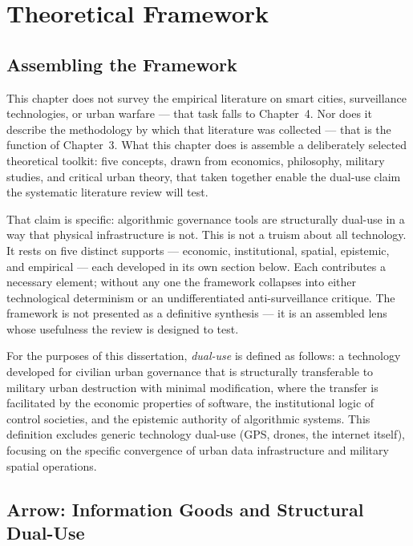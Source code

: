 \documentclass[12pt,a4paper,twoside]{report}
\begin{document}
\chapter{Theoretical Framework}
\label{ch:framework}

\section{Assembling the Framework}
\label{sec:assembling}

This chapter does not survey the empirical literature on smart cities, surveillance technologies, or urban warfare — that task falls to Chapter~4. Nor does it describe the methodology by which that literature was collected — that is the function of Chapter~3. What this chapter does is assemble a deliberately selected theoretical toolkit: five concepts, drawn from economics, philosophy, military studies, and critical urban theory, that taken together enable the dual-use claim the systematic literature review will test.

That claim is specific: algorithmic governance tools are structurally dual-use in a way that physical infrastructure is not. This is not a truism about all technology. It rests on five distinct supports — economic, institutional, spatial, epistemic, and empirical — each developed in its own section below. Each contributes a necessary element; without any one the framework collapses into either technological determinism or an undifferentiated anti-surveillance critique. The framework is not presented as a definitive synthesis — it is an assembled lens whose usefulness the review is designed to test.

For the purposes of this dissertation, \textit{dual-use} is defined as follows: a technology developed for civilian urban governance that is structurally transferable to military urban destruction with minimal modification, where the transfer is facilitated by the economic properties of software, the institutional logic of control societies, and the epistemic authority of algorithmic systems. This definition excludes generic technology dual-use (GPS, drones, the internet itself), focusing on the specific convergence of urban data infrastructure and military spatial operations.

\section{Arrow: Information Goods and Structural Dual-Use}
\label{sec:arrow}
\end{document}

